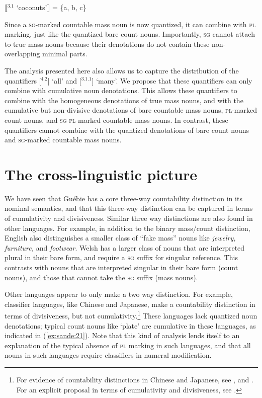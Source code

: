 \documentclass[output=paper,colorlinks,citecolor=brown]{langscibook}
\begin{document}
\ea%
    \label{ex:sande:20}
    $\llbracket$$^{3.1}$ `coconuts'$\rrbracket$ = \{a, b, c\}
\z

Since a \textsc{sg}-marked countable mass noun is now quantized, it can combine with \textsc{pl} marking, just like the quantized bare count nouns. Importantly, \textsc{sg} cannot attach to true mass nouns because their denotations do not contain these non-overlapping minimal parts.

The analysis presented here also allows us to capture the distribution of the quantifiers [$^{4.2}$] `all' and [$^{3.1.1}$] `many'. We propose that these quantifiers can only combine with cumulative noun denotations. This allows these quantifiers to combine with the homogeneous denotations of true mass nouns, and with the cumulative but non-divisive denotations of bare countable mass nouns, \textsc{pl}-marked count nouns, and \textsc{sg}-\textsc{pl}-marked countable mass nouns. In contrast, these quantifiers cannot combine with the quantized denotations of bare count nouns and \textsc{sg}-marked countable mass nouns.


\section{The cross-linguistic picture}\label{sec:sande:4}

We have seen that Guébie has a core three-way countability distinction in its nominal semantics, and that this three-way distinction can be captured in terms of cumulativity and divisiveness. Similar three way distinctions are also found in other languages. For example, in addition to the binary mass/count distinction, English also distinguishes a smaller class of ``fake mass'' nouns like \textit{jewelry, furniture,} and \textit{footwear}.
Welsh \citep{Grimm2012Chapter} has a larger class of nouns that are interpreted plural in their bare form, and require a \textsc{sg} suffix for singular reference. This contrasts with nouns that are interpreted singular in their bare form (count nouns), and those that cannot take the \textsc{sg} suffix (mass nouns).

Other languages appear to only make a two way distinction. For example, classifier languages, like Chinese and Japanese, make a countability distinction in terms of divisiveness, but not cumulativity.\footnote{For evidence of countability distinctions in Chinese and Japanese, see \citet{ChengSybesma1998, InagakiBarner2009}, and \citet{CheungEtAl2010}. For an explicit proposal in terms of cumulativity and divisiveness, see \citet{Deal2017}.} These languages lack quantized noun denotations; typical count nouns like `plate' are cumulative in these languages, as indicated in (\ref{ex:sande:21}). Note that this kind of analysis lends itself to an explanation of the typical absence of \textsc{pl} marking in such languages, and that all nouns in such languages require classifiers in numeral modification.
\end{document}
